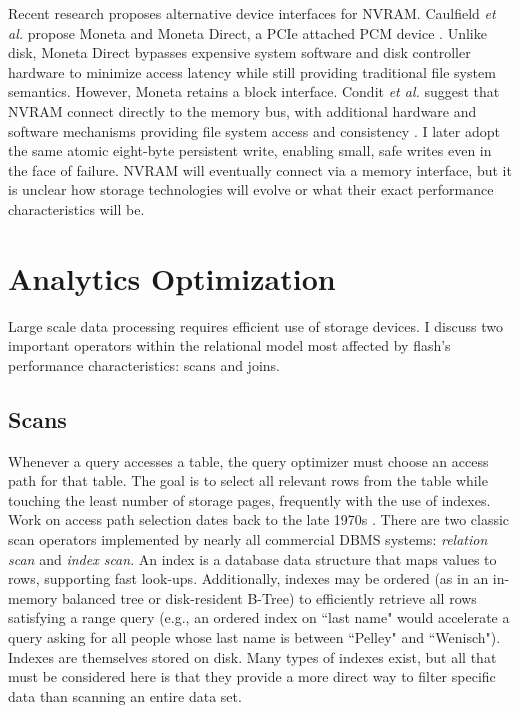 Recent research proposes alternative device interfaces for NVRAM.
Caulfield \emph{et al.} propose Moneta and Moneta Direct, a PCIe attached PCM device \cite{CaulfieldMollov12}.
Unlike disk, Moneta Direct bypasses expensive system software and disk controller hardware to minimize access latency while still providing traditional file system semantics.
However, Moneta retains a block interface.
Condit \emph{et al.} suggest that NVRAM connect directly to the memory bus, with additional hardware and software mechanisms providing file system access and consistency \cite{ConditNightingale09}.
I later adopt the same atomic eight-byte persistent write, enabling small, safe writes even in the face of failure.
NVRAM will eventually connect via a memory interface, but it is unclear how storage technologies will evolve or what their exact performance characteristics will be.

\section{Analytics Optimization}
\label{sec:Background:Analytics}

Large scale data processing requires efficient use of storage devices.
I discuss two important operators within the relational model most affected by flash's performance characteristics: scans and joins.

\subsection{Scans}
\label{sec:Background:Scans}

Whenever a query accesses a table, the query optimizer must choose an access path for that table. 
The goal is to select all relevant rows from the table while touching the least number of storage pages, frequently with the use of indexes.
Work on access path selection dates back to the late 1970s \cite{Selinger1979}.
There are two classic scan operators implemented by nearly all commercial DBMS systems: \emph{relation scan} and \emph{index scan}.
An index is a database data structure that maps values to rows, supporting fast look-ups.
Additionally, indexes may be ordered (as in an in-memory balanced tree or disk-resident B-Tree) to efficiently retrieve all rows satisfying a range query (e.g., an ordered index on ``last name" would accelerate a query asking for all people whose last name is between ``Pelley" and ``Wenisch").
Indexes are themselves stored on disk.
Many types of indexes exist, but all that must be considered here is that they provide a more direct way to filter specific data than scanning an entire data set.

